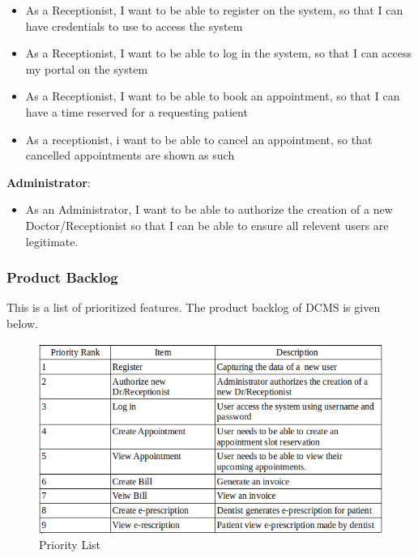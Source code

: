 \documentclass[11 pt]{article}
\begin{document}
    \begin{itemize}
  \item
  As a Receptionist, I want to be able to register on the system, so that I can have credentials to use to access the system
  \item
  As a Receptionist, I want to be able to log in the system, so that I can access my portal on the system
  \item
  As a Receptionist, I want to be able to book an appointment, so that I can 				have a time reserved for a requesting patient
  \item
   As a receptionist,  i want to be able to cancel an appointment, so that cancelled appointments are shown as such
   \end{itemize}
   \textbf{Administrator}:
   \begin{itemize}
   \item
   As an Administrator, I want to be able to authorize the creation of a new Doctor/Receptionist so that I can be able to ensure all relevent users are legitimate.
   \end{itemize}
  \subsubsection{Product Backlog}
  This is a list of prioritized features. The product backlog of DCMS is given below.
  
  \begin{figure}[h]
    \centering
    
    \includegraphics[width=\linewidth]{PriorityList.png}
    \caption{Priority List}
    \label{fig:ERD}
    \end{figure}
    
\end{document}
